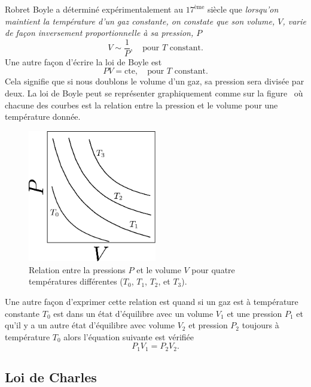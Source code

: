 \documentclass[a4paper,12pt]{book}
\begin{document}
Robret Boyle a déterminé expérimentalement au $17^\textrm{\`eme}$
siècle que \textit{lorsqu'on maintient la température d'un gaz constante, on constate que son volume, $V$, varie de façon inversement proportionnelle à sa pression, $P$}
\begin{equation}
V\sim\frac{1}{P},\quad \mbox{pour }T\mbox{ constant.}
\end{equation}
Une autre façon d'écrire la loi de Boyle est 
\begin{equation}
PV= \mbox{cte},\quad \mbox{pour }T\mbox{ constant.}
\end{equation}
Cela signifie que si nous doublons le volume d'un gaz, sa pression sera divisée par deux. La loi de Boyle peut se représenter graphiquement comme sur la figure~%
où chacune des courbes est la relation entre la pression et le volume pour une température donnée.
\begin{figure}
\begin{center}
\includegraphics[width=0.5\textwidth]{figs/boyle.pdf}
\caption{Relation entre la pressions $P$ et le volume $V$ pour quatre températures différentes ($T_0$, $T_1$, $T_2$, et $T_3$).}
\label{fig_kg}
\end{center}
\end{figure}
Une autre façon d'exprimer cette relation est quand si 
un gaz est à température constante $T_0$ est dans un état d'équilibre avec un volume $V_1$ et
une pression $P_1$ et qu'il y a un autre état d'équilibre avec volume $V_2$ et pression $P_2$ toujours à température $T_0$ alors l'équation suivante est vérifiée
\begin{equation}
P_1V_1=P_2V_2.
\end{equation}

\subsection{Loi de Charles}
\end{document}
